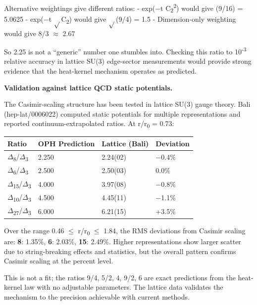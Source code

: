 \documentclass[11pt,a4paper]{article}
\theoremstyle{remark}
\begin{document}
Alternative weightings give different ratios:
- exp(\ensuremath{-}t C\textsubscript{2}\textsuperscript{2}) would give (9/16) = 5.0625
- exp(\ensuremath{-}t \ensuremath{\sqrt{}}C\textsubscript{2}) would give \ensuremath{\sqrt{}}(9/4) = 1.5
- Dimension-only weighting would give 8/3 \ensuremath{\approx} 2.67

So 2.25 is not a ``generic'' number one stumbles into. Checking this ratio
to 10\textsuperscript{-3} relative accuracy in lattice SU(3) edge-sector measurements
would provide strong evidence that the heat-kernel mechanism operates as
predicted.

\textbf{Validation against lattice QCD static potentials.}

The Casimir-scaling structure has been tested in lattice SU(3) gauge theory. Bali (hep-lat/0006022) computed static potentials for multiple representations and reported continuum-extrapolated ratios. At r/r\textsubscript{0} = 0.73:

{\def\LTcaptype{none} %
\begin{longtable}[]{@{}llll@{}}
\toprule\noalign{}
Ratio & OPH Prediction & Lattice (Bali) & Deviation \\
\midrule\noalign{}
\endhead
\bottomrule\noalign{}
\endlastfoot
\ensuremath{\Delta}\textsubscript{8}/\ensuremath{\Delta}\textsubscript{3} & 2.250 & 2.24(02) & \ensuremath{-}0.4\% \\
\ensuremath{\Delta}\textsubscript{6}/\ensuremath{\Delta}\textsubscript{3} & 2.500 & 2.50(03) & 0.0\% \\
\ensuremath{\Delta}\textsubscript{15}/\ensuremath{\Delta}\textsubscript{3} & 4.000 & 3.97(08) & \ensuremath{-}0.8\% \\
\ensuremath{\Delta}\textsubscript{10}/\ensuremath{\Delta}\textsubscript{3} & 4.500 & 4.45(11) & \ensuremath{-}1.1\% \\
\ensuremath{\Delta}\textsubscript{27}/\ensuremath{\Delta}\textsubscript{3} & 6.000 & 6.21(15) & +3.5\% \\
\end{longtable}
}

Over the range 0.46 \ensuremath{\leq} r/r\textsubscript{0} \ensuremath{\leq} 1.84, the RMS deviations from Casimir scaling are: \textbf{8}: 1.35\%, \textbf{6}: 2.03\%, \textbf{15}: 2.49\%. Higher representations show larger scatter due to string-breaking effects and statistics, but the overall pattern confirms Casimir scaling at the percent level.

This is not a fit; the ratios 9/4, 5/2, 4, 9/2, 6 are exact predictions from
the heat-kernel law with no adjustable parameters. The lattice data validates
the mechanism to the precision achievable with current methods.
\end{document}
